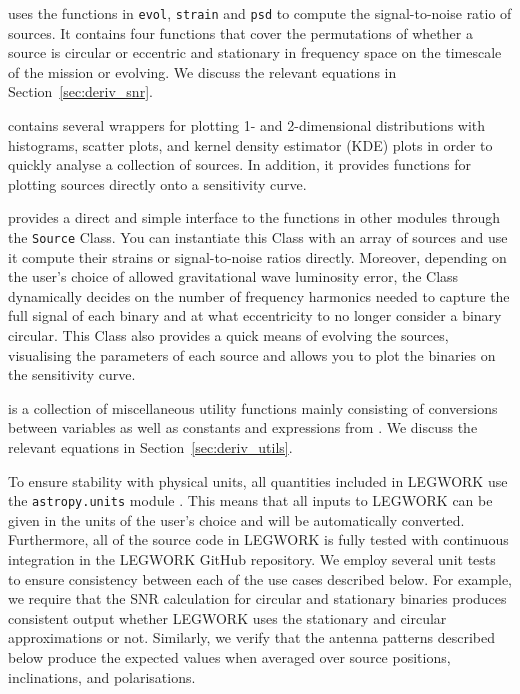 \documentclass[twocolumn]{aastex631}
\newcommand{\lw}{LEGWORK}
\newcommand{\lwColour}{SeaGreen}
\newcommand{\lwModLink}[1]{\href{https://legwork.readthedocs.io/en/latest/modules.html\#module-legwork.#1}{\color{\lwColour}{\texttt{#1}}}}
\begin{document}
\lwModLink{snr} uses the functions in \texttt{evol}, \texttt{strain} and \texttt{psd} to compute the signal-to-noise ratio of sources. It contains four functions that cover the permutations of whether a source is circular or eccentric and stationary in frequency space on the timescale of the mission or evolving. We discuss the relevant equations in Section~\ref{sec:deriv_snr}.

\lwModLink{visualisation} contains several wrappers for plotting 1- and 2-dimensional distributions with histograms, scatter plots, and kernel density estimator (KDE) plots in order to quickly analyse a collection of sources. In addition, it provides functions for plotting sources directly onto a sensitivity curve.

\lwModLink{source} provides a direct and simple interface to the functions in other modules through the \texttt{Source} Class. You can instantiate this Class with an array of sources and use it compute their strains or signal-to-noise ratios directly. Moreover, depending on the user's choice of allowed gravitational wave luminosity error, the Class dynamically decides on the number of frequency harmonics needed to capture the full signal of each binary and at what eccentricity to no longer consider a binary circular. This Class also provides a quick means of evolving the sources, visualising the parameters of each source and allows you to plot the binaries on the sensitivity curve.

\lwModLink{utils} is a collection of miscellaneous utility functions mainly consisting of conversions between variables as well as constants and expressions from \citet{Peters+1964}. We discuss the relevant equations in Section~\ref{sec:deriv_utils}.

To ensure stability with physical units, all quantities included in \lw{} use the \texttt{astropy.units} module \citep{AstropyCollaboration+2013, AstropyCollaboration+2018}. This means that all inputs to \lw{} can be given in the units of the user's choice and will be automatically converted. Furthermore, all of the source code in \lw{} is fully tested with continuous integration in the \lw{} GitHub repository. We employ several unit tests to ensure consistency between each of the use cases described below. For example, we require that the SNR calculation for circular and stationary binaries produces consistent output whether \lw{} uses the stationary and circular approximations or not. Similarly, we verify that the antenna patterns described below produce the expected values when averaged over source positions, inclinations, and polarisations.
\end{document}
